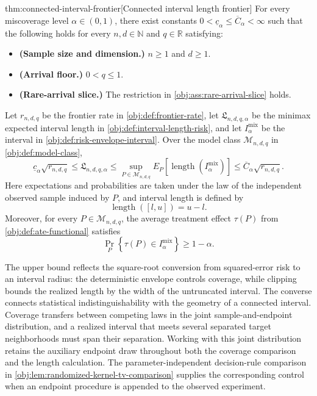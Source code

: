\begin{theoremv}{thm:connected-interval-frontier}[Connected interval length frontier]
For every miscoverage level \(\alpha\in(0,1)\), there exist constants \(0<\underline c_\alpha\le\overline C_\alpha<\infty\) such that the following holds for every \(n,d\in\mathbb N\) and \(q\in\mathbb R\) satisfying:
\begin{itemize}
\item \textbf{(Sample size and dimension.)} \(n\ge1\) and \(d\ge1\).
\item \textbf{(Arrival floor.)} \(0<q\le1\).
\item \textbf{(Rare-arrival slice.)} The restriction in \cref{obj:ass:rare-arrival-slice} holds.
\end{itemize}
Let \(r_{n,d,q}\) be the frontier rate in \cref{obj:def:frontier-rate}, let \(\mathfrak L_{n,d,q,\alpha}\) be the minimax expected interval length in \cref{obj:def:interval-length-risk}, and let \(I^{\mathrm{mix}}_\alpha\) be the interval in \cref{obj:def:risk-envelope-interval}. Over the model class \(\mathcal M_{n,d,q}\) in \cref{obj:def:model-class},
\[
\underline c_\alpha\sqrt{r_{n,d,q}}
\le \mathfrak L_{n,d,q,\alpha}
\le \sup_{P\in\mathcal M_{n,d,q}}
E_P\!\left[\operatorname{length}(I^{\mathrm{mix}}_\alpha)\right]
\le \overline C_\alpha\sqrt{r_{n,d,q}}.
\]
Here expectations and probabilities are taken under the law of the independent observed sample induced by \(P\), and interval length is defined by
\[
\operatorname{length}([l,u])=u-l.
\]
Moreover, for every \(P\in\mathcal M_{n,d,q}\), the average treatment effect \(\tau(P)\) from \cref{obj:def:ate-functional} satisfies
\[
\Pr_P\!\left\{\tau(P)\in I^{\mathrm{mix}}_\alpha\right\}\ge1-\alpha.
\]
\end{theoremv}

The upper bound reflects the square-root conversion from squared-error risk to an interval radius: the deterministic envelope controls coverage, while clipping bounds the realized length by the width of the untruncated interval. The converse connects statistical indistinguishability with the geometry of a connected interval. Coverage transfers between competing laws in the joint sample-and-endpoint distribution, and a realized interval that meets several separated target neighborhoods must span their separation. Working with this joint distribution retains the auxiliary endpoint draw throughout both the coverage comparison and the length calculation. The parameter-independent decision-rule comparison in \cref{obj:lem:randomized-kernel-tv-comparison} supplies the corresponding control when an endpoint procedure is appended to the observed experiment.

